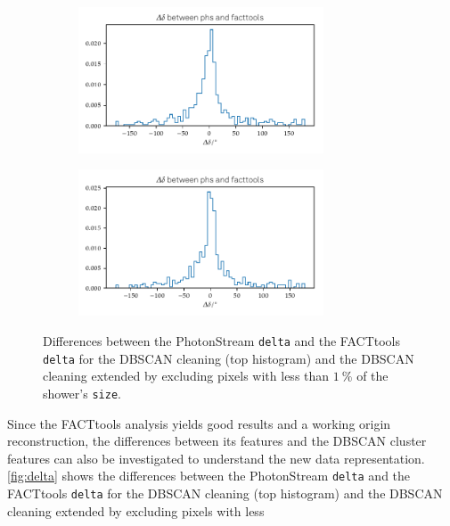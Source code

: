 %
\begin{figure}
  \begin{subfigure}{\textwidth}
    \centering
    \includegraphics[width=0.8\textwidth]{Plots/delta_delta/delta_diff_hist_different_cleanings_DBSCAN_delta_20131104_162.pdf}
  \end{subfigure}
  \begin{subfigure}{\textwidth}
    \centering
    \includegraphics[width=0.8\textwidth]{Plots/delta_delta/delta_diff_hist_perc_DBSCAN_delta_20131104_162.pdf}
  \end{subfigure}
  \caption{Differences between the PhotonStream \texttt{delta} and the FACTtools \texttt{delta} for the DBSCAN cleaning (top histogram) and the DBSCAN cleaning extended by excluding pixels with less than $\SI{1}{\percent}$ of the shower's \texttt{size}.}
  \label{fig:delta}
\end{figure}
%
Since the FACTtools analysis yields good results and a working origin
reconstruction, the differences between its features and the DBSCAN cluster
features can also be investigated to understand the new data representation.
\autoref{fig:delta} shows the differences between the PhotonStream
\texttt{delta} and the FACTtools \texttt{delta} for the DBSCAN cleaning (top
histogram) and the DBSCAN cleaning extended by excluding pixels with less
